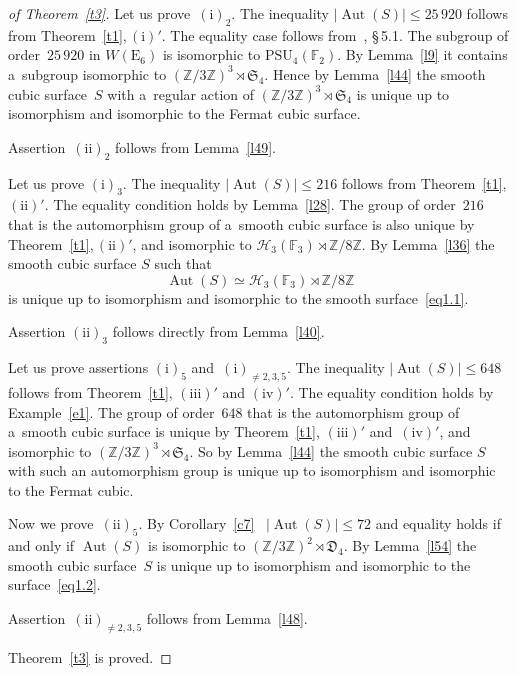 \documentclass{amsart}
\numberwithin{equation}{section}
\theoremstyle{plain}
\theoremstyle{definition}
\theoremstyle{remark}
\begin{document}
\begin{proof}[of Theorem~\ref{t3}]
Let us prove~$(\mathrm{i})_2$. The inequality $|{\operatorname{Aut}(S)}| \leqslant 25\,920$ follows from Theorem~\ref{t1},\,$(\mathrm{i})'$. The equality case follows from~\cite{8}, \S\,5.1. The subgroup of order~$25\,920$ in $W(\mathrm{E}_6)$ is isomorphic to $\mathrm{PSU}_4(\mathbb{F}_2)$. By Lemma~\ref{l9} it contains a~subgroup isomorphic to  $(\mathbb{Z}/3\mathbb{Z})^3 \rtimes \mathfrak{S}_4$. Hence by Lemma~\ref{l44} the smooth cubic surface~$S$ with a~regular action of  $(\mathbb{Z}/3\mathbb{Z})^3 \rtimes \mathfrak{S}_4$  is unique up to isomorphism and isomorphic to the Fermat cubic surface.

Assertion~$(\mathrm{ii})_2$ follows from Lemma~\ref{l49}.

Let us prove $(\mathrm{i})_3$. The inequality $|{\operatorname{Aut}(S)}| \leqslant 216$ follows from Theorem~\ref{t1},\,$(\mathrm{ii})'$. The equality condition holds by Lemma~\ref{l28}. The group of order~$216$ that is the automorphism group of a~smooth cubic surface is also unique by Theorem~\ref{t1},\,$(\mathrm{ii})'$, and isomorphic to $ \mathcal{H}_3(\mathbb{F}_3) \rtimes \mathbb{Z}/8\mathbb{Z}$. By Lemma~\ref{l36} the smooth cubic surface $S$
such that
$$
\operatorname{Aut}(S) \simeq \mathcal{H}_3(\mathbb{F}_3) \rtimes \mathbb{Z}/8\mathbb{Z}
$$
is unique up to isomorphism and isomorphic to the smooth surface~\eqref{eq1.1}.

Assertion $(\mathrm{ii})_3$ follows directly from Lemma~\ref{l40}.

Let us prove assertions $(\mathrm{i})_5$ and~$(\mathrm{i})_{\neq 2,3,5}$. The inequality $|{\operatorname{Aut}(S)}| \leqslant 648$ follows from Theorem~\ref{t1}, $(\mathrm{iii})'$ and $(\mathrm{iv})'$. The equality condition holds by Example~\ref{e1}. The group of order~$648$ that is the automorphism group of a~smooth cubic surface is unique by Theorem~\ref{t1}, $(\mathrm{iii})'$ and~$(\mathrm{iv})'$, and isomorphic to $(\mathbb{Z}/3\mathbb{Z})^3 \rtimes \mathfrak{S}_4$. So by Lemma~\ref{l44} the smooth cubic surface $S$ with such an automorphism group is unique up to isomorphism and isomorphic to the Fermat cubic.

Now we prove~$(\mathrm{ii})_5$. By Corollary~\ref{c7} \ $|{\operatorname{Aut}(S)}| \leqslant 72$ and equality holds if and only if $\operatorname{Aut}(S)$ is isomorphic to $(\mathbb{Z}/3\mathbb{Z})^2 \rtimes \mathfrak{D}_4$. By Lemma~\ref{l54} the smooth cubic surface~$S$ is unique up to isomorphism and isomorphic to the surface~\eqref{eq1.2}.

Assertion~$(\mathrm{ii})_{\neq 2,3,5}$ follows from Lemma~\ref{l48}.

Theorem~\ref{t3} is proved.
\end{proof}
\end{document}
